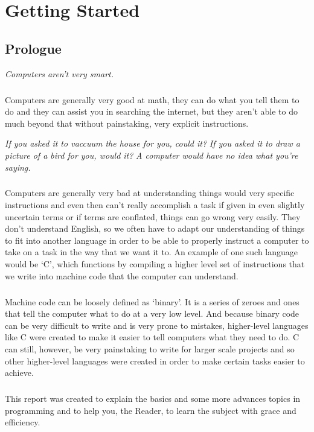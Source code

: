 \chapter{Getting Started}

\section{Prologue}

\begin{displayquote}
   \textit{Computers aren't very smart.}
\end{displayquote}

\paragraph{}
   Computers are generally very good at math, they can do what you tell them to do and they can assist you in searching the internet, but they aren't
   able to do much beyond that without painstaking, very explicit instructions.

\begin{displayquote}
   \textit{If you asked it to vaccuum the house for you, could it?}
   \textit{If you asked it to draw a picture of a bird for you, would it?}
   \textit{A computer would have no idea what you're saying.}
\end{displayquote}

\paragraph{}
   Computers are generally very bad at understanding things would very specific instructions and even then can't really accomplish a task if given in
   even slightly uncertain terms or if terms are conflated, things can go wrong very easily. They don't understand English, so we often have to adapt
   our understanding of things to fit into another language in order to be able to properly instruct a computer to take on a task in the way that we
   want it to. An example of one such language would be `C', which functions by compiling a higher level set of instructions that we write into
   machine code that the computer can understand.

\paragraph{}
   Machine code can be loosely defined as `binary'. It is a series of zeroes and ones that tell the computer what to do at a very low level. And
   because binary code can be very difficult to write and is very prone to mistakes, higher-level languages like C were created to make it easier to
   tell computers what they need to do. C can still, however, be very painstaking to write for larger scale projects and so other higher-level
   languages were created in order to make certain tasks easier to achieve.

\paragraph{}
   This report was created to explain the basics and some more advances topics in programming and to help you, the Reader, to learn the subject with
   grace and efficiency.

\newpage
